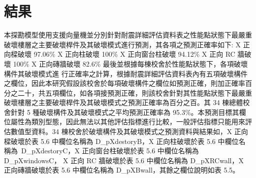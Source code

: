 \section{結果}

本探勘模型使用支援向量機並分別針對耐震詳細評估資料表之性能點狀態下最嚴重破壞樓層之主要破壞桿件及其破壞模式進行預測，其各項之預測正確率如下:
X 正向樑破壞 97.06\%
X 正向柱破壞 100\%
X 正向窗台柱破壞 94.12\% X 正向 RC 牆破壞 100\% X 正向磚牆破壞 82.6\%
最後並根據每棟校舍於性能點狀態下，各項破壞構件其破壞模式進 行正確率之計算，根據耐震詳細評估資料表內有五項破壞構件之欄位，因此本研究假設該校舍於每項破壞構件之欄位如預測正確，則加正確率百分之二十，共五項欄位，如各項接預測正確，則該校舍針對其性能點狀態下最嚴重破壞樓層之主要破壞桿件及其破壞模式之預測正確率為百分之百。其 34 棟總體校舍針對 5 種破壞構件及其破壞模式之平均預測正確率為 95.3\%。本預測目標其欄位屬性為類別型態，因此無法以其他評估指標進行比較，一般評估指標只能用來評估數值型資料。34 棟校舍於破壞構件及其破壞模式之預測資料與結果如，X 正向樑破壞於表 5.6 中欄位名稱為 D\_pXdestoryB，X 正向柱破壞於表 5.6 中欄位名稱為~D\_pXdestoryC，X 正向窗台柱破壞於表 5.6 中欄位名稱為 D\_pXwindowsC， X 正向 RC 牆破壞於表 5.6 中欄位名稱為 D\_pXRCwall，X 正向磚牆破壞於表 5.6 中欄位名稱為 D\_pXBwall，其餘之欄位說明如表 5.5。

